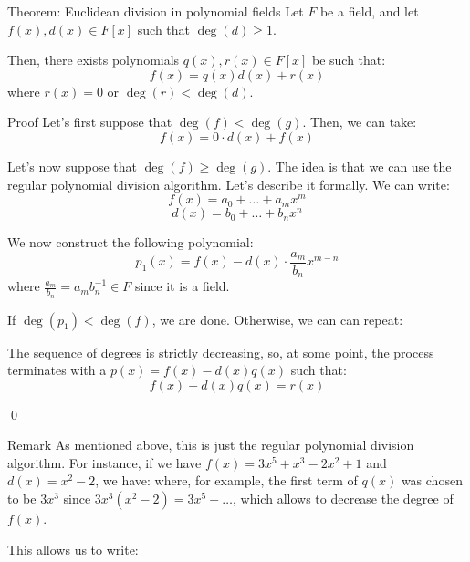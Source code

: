 \documentclass[a4paper]{article}
\begin{document}
\begin{parag}{Theorem: Euclidean division in polynomial fields}
    Let $F$ be a field, and let $f\left(x\right), d\left(x\right) \in F\left[x\right]$ such that $\deg\left(d\right) \geq 1$.

    Then, there exists polynomials $q\left(x\right), r\left(x\right) \in F\left[x\right]$ be such that: 
    \[f\left(x\right) = q\left(x\right)d\left(x\right) + r\left(x\right)\]
    where $r\left(x\right) = 0$ or $\deg\left(r\right) < \deg\left(d\right)$.

    \begin{subparag}{Proof}
        Let's first suppose that $\deg\left(f\right) < \deg\left(g\right)$. Then, we can take: 
        \[f\left(x\right) = 0\cdot d\left(x\right) + f\left(x\right)\]
        
        Let's now suppose that $\deg\left(f\right) \geq \deg\left(g\right)$. The idea is that we can use the regular polynomial division algorithm. Let's describe it formally. We can write: 
        \[f\left(x\right) = a_0 + \ldots + a_m x^m\]
        \[d\left(x\right) = b_0 + \ldots + b_n x^n\]
        
        We now construct the following polynomial:
        \[p_1\left(x\right) = f\left(x\right) - d\left(x\right) \cdot \frac{a_m}{b_n} x^{m-n}\]
        where $\frac{a_m}{b_n} = a_m b_n^{-1} \in F$ since it is a field. 

        If $\deg\left(p_1\right) < \deg\left(f\right)$, we are done. Otherwise, we can can repeat: 
        
        The sequence of degrees is strictly decreasing, so, at some point, the process terminates with a $p\left(x\right) = f\left(x\right) - d\left(x\right) q\left(x\right)$ such that: 
        \[f\left(x\right) -d\left(x\right)q\left(x\right) = r\left(x\right)\]

        \qed
    \end{subparag}

    \begin{subparag}{Remark}
        As mentioned above, this is just the regular polynomial division algorithm. For instance, if we have $f\left(x\right) = 3x^5 + x^3 - 2x^2 + 1$ and $d\left(x\right) = x^2 - 2$, we have: 
        where, for example, the first term of $q\left(x\right)$ was chosen to be $3x^3$ since $3x^3\left(x^2 - 2\right) = 3x^5 + \ldots$, which allows to decrease the degree of $f\left(x\right)$.

        This allows us to write:
    \end{subparag}
\end{parag}
\end{document}

